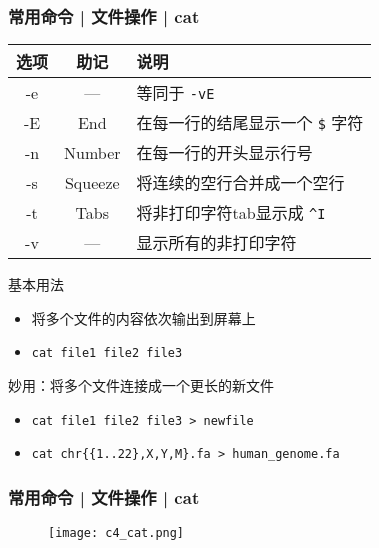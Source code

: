 \begin{frame}[fragile]
  \frametitle{常用命令 | 文件操作 | cat}
  \begin{table}
    \centering
    \begin{tabularx}{0.9\textwidth}{ccX}
      \hline
      \rowcolor{blue!50}选项 & 助记 & 说明\\
      \hline
      -e & --- & 等同于 \verb|-vE|\\
      -E & End & 在每一行的结尾显示一个 \verb|$| 字符\\
      -n & Number & 在每一行的开头显示行号\\
      -s & Squeeze & 将连续的空行合并成一个空行\\
      -t & Tabs & 将非打印字符tab显示成 \verb|^I|\\
      -v & --- & 显示所有的非打印字符\\
      \hline
    \end{tabularx}
  \end{table}
  \vspace{-0.5em}
  \pause
  \begin{block}{基本用法}
    \begin{itemize}
      \item 将多个文件的内容依次输出到屏幕上
      \item \verb|cat file1 file2 file3|
    \end{itemize}
  \end{block}
  \vspace{-0.5em}
  \pause
  \begin{block}{\alert{妙用：将多个文件连接成一个更长的新文件}}
    \begin{itemize}
      \item \verb|cat file1 file2 file3 > newfile|
      \item \verb|cat chr{{1..22},X,Y,M}.fa > human_genome.fa|
    \end{itemize}
  \end{block}
\end{frame}

\begin{frame}[fragile]
  \frametitle{常用命令 | 文件操作 | cat}
  \begin{figure}
    \centering
    \texttt{[image: c4\_cat.png]}
  \end{figure}
\end{frame}

